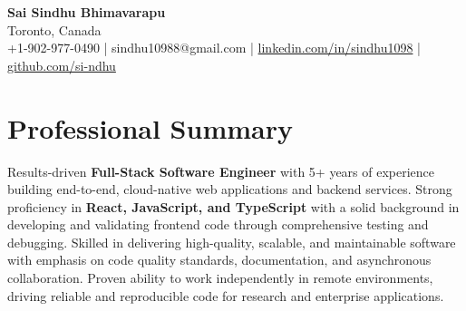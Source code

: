 \documentclass[letterpaper,11pt]{article}
\begin{document}
\begin{center}
  {\Large \textbf{Sai Sindhu Bhimavarapu}} \\
  Toronto, Canada \\
  +1-902-977-0490 \enspace | \enspace sindhu10988@gmail.com \enspace | \enspace \href{https://www.linkedin.com/in/sindhu1098/}{linkedin.com/in/sindhu1098} \enspace | \enspace \href{https://github.com/si-ndhu}{github.com/si-ndhu}
\end{center}

\section{Professional Summary}
  \begin{itemize}[leftmargin=0.15in, label={}]
    \small{\item{
     Results-driven \textbf{Full-Stack Software Engineer} with 5+ years of experience building end-to-end, cloud-native web applications and backend services. Strong proficiency in \textbf{React, JavaScript, and TypeScript} with a solid background in developing and validating frontend code through comprehensive testing and debugging. Skilled in delivering high-quality, scalable, and maintainable software with emphasis on code quality standards, documentation, and asynchronous collaboration. Proven ability to work independently in remote environments, driving reliable and reproducible code for research and enterprise applications.
    }}
  \end{itemize}
\vspace{-16pt}

\end{document}
